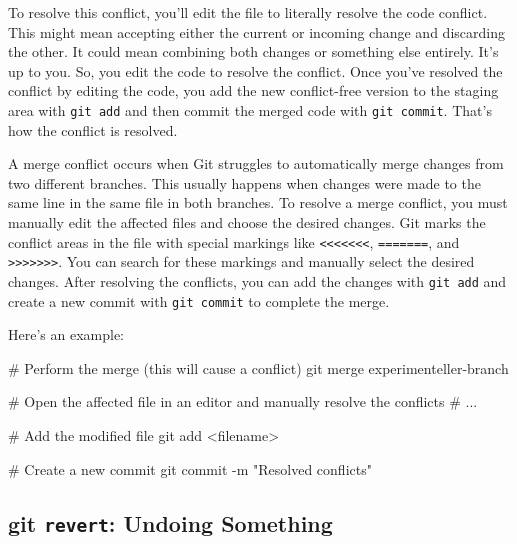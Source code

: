 \documentclass[
  letterpaper,
  DIV=11,
  numbers=noendperiod]{scrreprt}
\newenvironment{Shaded}{\begin{snugshade}}{\end{snugshade}}
\newcommand{\AttributeTok}[1]{\textcolor[rgb]{0.40,0.45,0.13}{#1}}
\newcommand{\CommentTok}[1]{\textcolor[rgb]{0.37,0.37,0.37}{#1}}
\newcommand{\FunctionTok}[1]{\textcolor[rgb]{0.28,0.35,0.67}{#1}}
\newcommand{\NormalTok}[1]{\textcolor[rgb]{0.00,0.23,0.31}{#1}}
\newcommand{\OperatorTok}[1]{\textcolor[rgb]{0.37,0.37,0.37}{#1}}
\newcommand{\StringTok}[1]{\textcolor[rgb]{0.13,0.47,0.30}{#1}}
\begin{document}
To resolve this conflict, you'll edit the file to literally resolve the
code conflict. This might mean accepting either the current or incoming
change and discarding the other. It could mean combining both changes or
something else entirely. It's up to you. So, you edit the code to
resolve the conflict. Once you've resolved the conflict by editing the
code, you add the new conflict-free version to the staging area with
\texttt{git\ add} and then commit the merged code with
\texttt{git\ commit}. That's how the conflict is resolved.

A merge conflict occurs when Git struggles to automatically merge
changes from two different branches. This usually happens when changes
were made to the same line in the same file in both branches. To resolve
a merge conflict, you must manually edit the affected files and choose
the desired changes. Git marks the conflict areas in the file with
special markings like
\texttt{\textless{}\textless{}\textless{}\textless{}\textless{}\textless{}\textless{}},
\texttt{=======}, and
\texttt{\textgreater{}\textgreater{}\textgreater{}\textgreater{}\textgreater{}\textgreater{}\textgreater{}}.
You can search for these markings and manually select the desired
changes. After resolving the conflicts, you can add the changes with
\texttt{git\ add} and create a new commit with \texttt{git\ commit} to
complete the merge.

Here's an example:

\begin{Shaded}
\begin{Highlighting}[]
\CommentTok{\# Perform the merge (this will cause a conflict)}
\FunctionTok{git}\NormalTok{ merge experimenteller{-}branch}

\CommentTok{\# Open the affected file in an editor and manually resolve the conflicts}
\CommentTok{\# ...}

\CommentTok{\# Add the modified file}
\FunctionTok{git}\NormalTok{ add }\OperatorTok{\textless{}}\NormalTok{filename}\OperatorTok{\textgreater{}}

\CommentTok{\# Create a new commit}
\FunctionTok{git}\NormalTok{ commit }\AttributeTok{{-}m} \StringTok{"Resolved conflicts"}
\end{Highlighting}
\end{Shaded}

\subsection{\texorpdfstring{git \texttt{revert}: Undoing
Something}{git revert: Undoing Something}}\label{git-revert-undoing-something}
\end{document}
